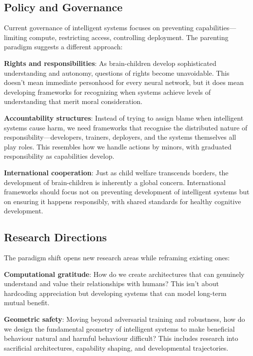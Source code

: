 \subsection{Policy and Governance}\label{subsec:policy-and-governance}

Current governance of intelligent systems focuses on preventing capabilities---limiting compute, restricting access, controlling deployment.
The parenting paradigm suggests a different approach:

\textbf{Rights and responsibilities}: As brain-children develop sophisticated understanding and autonomy, questions of rights become unavoidable.
This doesn't mean immediate personhood for every neural network, but it does mean developing frameworks for recognizing when systems achieve levels of understanding that merit moral consideration.

\textbf{Accountability structures}: Instead of trying to assign blame when intelligent systems cause harm, we need frameworks that recognise the distributed nature of responsibility---developers, trainers, deployers, and the systems themselves all play roles.
This resembles how we handle actions by minors, with graduated responsibility as capabilities develop.

\textbf{International cooperation}: Just as child welfare transcends borders, the development of brain-children is inherently a global concern.
International frameworks should focus not on preventing development of intelligent systems but on ensuring it happens responsibly, with shared standards for healthy cognitive development.

\subsection{Research Directions}\label{subsec:research-directions}

The paradigm shift opens new research areas while reframing existing ones:

\textbf{Computational gratitude}: How do we create architectures that can genuinely understand and value their relationships with humans?
This isn't about hardcoding appreciation but developing systems that can model long-term mutual benefit.

\textbf{Geometric safety}: Moving beyond adversarial training and robustness, how do we design the fundamental geometry of intelligent systems to make beneficial behaviour natural and harmful behaviour difficult?
This includes research into sacrificial architectures, capability shaping, and developmental trajectories.


